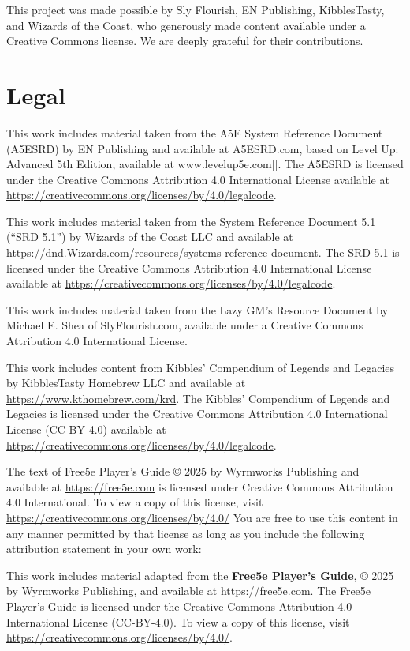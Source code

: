 This project was made possible by Sly Flourish, EN Publishing,
KibblesTasty, and Wizards of the Coast, who generously made content
available under a Creative Commons license. We are deeply grateful for
their contributions.

\section{Legal}\label{_legal}

This work includes material taken from the A5E System Reference Document
(A5ESRD) by EN Publishing and available at A5ESRD.com, based on Level
Up: Advanced 5th Edition, available at www.levelup5e.com{[}{]}. The
A5ESRD is licensed under the Creative Commons Attribution 4.0
International License available at
\url{https://creativecommons.org/licenses/by/4.0/legalcode}.

This work includes material taken from the System Reference Document 5.1
(``SRD 5.1'') by Wizards of the Coast LLC and available at
\url{https://dnd.Wizards.com/resources/systems-reference-document}. The
SRD 5.1 is licensed under the Creative Commons Attribution 4.0
International License available at
\url{https://creativecommons.org/licenses/by/4.0/legalcode}.

This work includes material taken from the Lazy GM's Resource Document
by Michael E. Shea of SlyFlourish.com, available under a Creative
Commons Attribution 4.0 International License.

This work includes content from Kibbles' Compendium of Legends and
Legacies by KibblesTasty Homebrew LLC and available at
\url{https://www.kthomebrew.com/krd}. The Kibbles' Compendium of Legends
and Legacies is licensed under the Creative Commons Attribution 4.0
International License (CC-BY-4.0) available at
\url{https://creativecommons.org/licenses/by/4.0/legalcode}.

The text of Free5e Player's Guide © 2025 by Wyrmworks Publishing and
available at \url{https://free5e.com} is licensed under Creative Commons
Attribution 4.0 International. To view a copy of this license, visit
\url{https://creativecommons.org/licenses/by/4.0/} You are free to use
this content in any manner permitted by that license as long as you
include the following attribution statement in your own work:

This work includes material adapted from the \textbf{Free5e Player's
Guide}, © 2025 by Wyrmworks Publishing, and available at
\url{https://free5e.com}. The Free5e Player's Guide is licensed under
the Creative Commons Attribution 4.0 International License (CC-BY-4.0).
To view a copy of this license, visit
\url{https://creativecommons.org/licenses/by/4.0/}.

